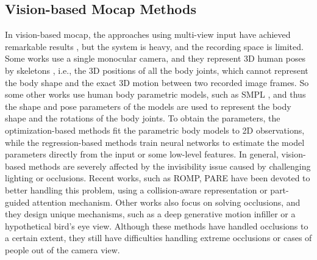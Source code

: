 \documentclass[sigconf,nonacm=true]{acmart}
\begin{document}
\subsection{Vision-based Mocap Methods}
In vision-based mocap, the approaches using multi-view input have achieved remarkable results \cite{harvesting17, CrossVF, LearnableTO, remelli2020lightweight, chun2023learnable, reddy2021tessetrack}, but the system is heavy, and the recording space is limited. 
Some works use a single monocular camera, and they represent 3D human poses by skeletons \cite{pavllo20193d,sharma2019monocular,xu2020deep,zhen2020smap}, i.e., the 3D positions of all the body joints, which cannot represent the body shape and the exact 3D motion between two recorded image frames.
So some other works use human body parametric models, such as SMPL \cite{SMPL}, and thus the shape and pose parameters of the models are used to represent the body shape and the rotations of the body joints.
To obtain the parameters, the optimization-based methods \cite{Lassner, Bogo:ECCV:2016,xiang2019monocular,pavlakos2018learning} fit the parametric body models to 2D observations, while the regression-based methods \cite{kolotouros2019convolutional, hmr, kanazawa2019learning, VIBE, zanfir2021neural, minimal, zhang2022mixste, PhysAware, li2022cliff} train neural networks to estimate the model parameters directly from the input or some low-level features. 
In general, vision-based methods are severely affected by the invisibility issue caused by challenging lighting or occlusions.
Recent works, such as ROMP\cite{ROMP}, PARE\cite{PARE} 
have been devoted to better handling this problem, using a collision-aware representation or part-guided attention mechanism.
Other works \cite{yuan2022glamr,BEV,huang2022occluded} also focus on solving occlusions, and they design unique mechanisms, such as a deep generative motion infiller or a hypothetical bird's eye view.
Although these methods have handled occlusions to a certain extent, they still have difficulties handling extreme occlusions or cases of people out of the camera view.
\end{document}
